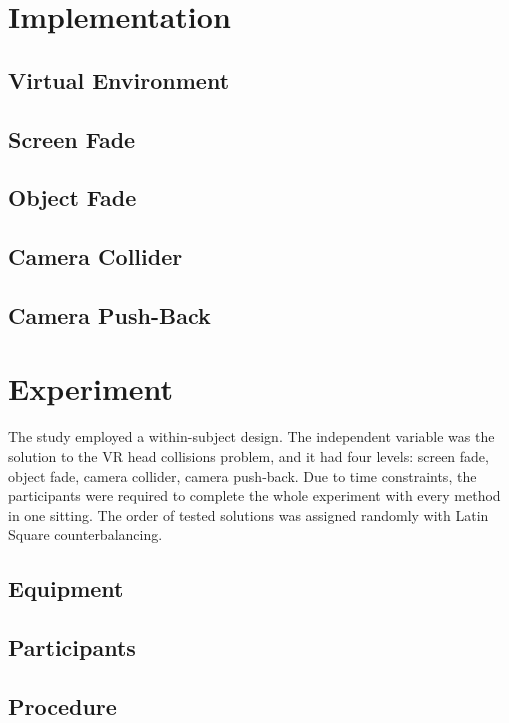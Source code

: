 \section{Implementation}

\subsection{Virtual Environment}

\subsection{Screen Fade}

\subsection{Object Fade}

\subsection{Camera Collider}

\subsection{Camera Push-Back}

\section{Experiment}

The study employed a within-subject design. The independent variable was the solution to the VR head collisions problem, and it had four levels: screen fade, object fade, camera collider, camera push-back. Due to time constraints, the participants were required to complete the whole experiment with every method in one sitting. The order of tested solutions was assigned randomly with Latin Square counterbalancing. 

\subsection{Equipment}

\subsection{Participants}

\subsection{Procedure}